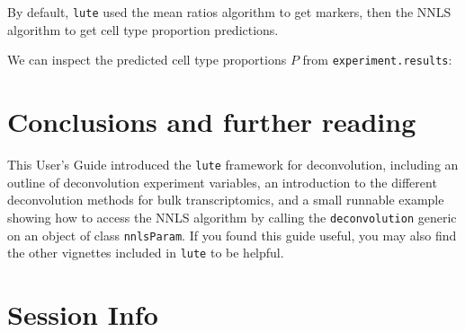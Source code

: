 \documentclass[]{article}
\newcommand{\hlstr}[1]{\textcolor[rgb]{0.251,0.627,0.251}{#1}}%
\newcommand{\hlcom}[1]{\textcolor[rgb]{0.502,0.502,0.502}{\textit{#1}}}%
\newcommand{\hlstd}[1]{\textcolor[rgb]{0.251,0.251,0.251}{#1}}%
\newenvironment{Shaded}{\begin{myshaded}}{\end{myshaded}}
\newcommand{\SpecialCharTok}[1]{\hlstr{#1}}
\newcommand{\DocumentationTok}[1]{\hlcom{#1}}
\newcommand{\NormalTok}[1]{\hlstd{#1}}
\begin{document}
By default, \texttt{lute} used the mean ratios algorithm to get markers, then the
NNLS algorithm to get cell type proportion predictions.

We can inspect the predicted cell type proportions \(P\) from \texttt{experiment.results}:

\begin{Shaded}
\end{Shaded}

\hypertarget{conclusions-and-further-reading}{%
\section{Conclusions and further reading}\label{conclusions-and-further-reading}}

This User's Guide introduced the \texttt{lute} framework for deconvolution, including
an outline of deconvolution experiment variables, an introduction to the
different deconvolution methods for bulk transcriptomics, and a small runnable
example showing how to access the NNLS algorithm by calling the \texttt{deconvolution}
generic on an object of class \texttt{nnlsParam}. If you found this guide useful, you
may also find the other vignettes included in \texttt{lute} to be helpful.

\hypertarget{session-info}{%
\section{Session Info}\label{session-info}}
\end{document}
